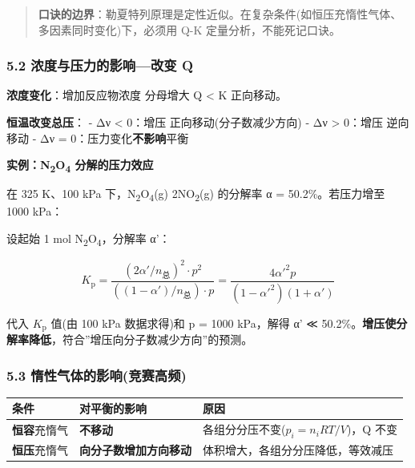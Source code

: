\begin{quote}
\textbf{口诀的边界}：勒夏特列原理是定性近似。在复杂条件(如恒压充惰性气体、多因素同时变化)下，必须用 Q-K 定量分析，不能死记口诀。
\end{quote}

\subsubsection{5.2 浓度与压力的影响---改变 Q}\label{ux6d53ux5ea6ux4e0eux538bux529bux7684ux5f71ux54cdux6539ux53d8-q}

\textbf{浓度变化}：增加反应物浓度 \箭 分母增大 \箭 Q \textless{} K \箭 正向移动。

\textbf{恒温改变总压}：
- Δν \textless{} 0：增压 \箭 正向移动(分子数减少方向)
- Δν \textgreater{} 0：增压 \箭 逆向移动
- Δν = 0：压力变化\textbf{不影响}平衡

\textbf{实例：N\textsubscript{2}O\textsubscript{4} 分解的压力效应}

在 325 K、100 kPa 下，N\textsubscript{2}O\textsubscript{4}(g) \衡 2NO\textsubscript{2}(g) 的分解率 α = 50.2\%。若压力增至 1000 kPa：

设起始 1 mol N\textsubscript{2}O\textsubscript{4}，分解率 α'：

\[
K_{\mathrm p} = \frac{(2\alpha'/n_{总})^2 \cdot p^2}{((1-\alpha')/n_{总}) \cdot p} = \frac{4\alpha'^2 p}{(1-\alpha'^2)(1+\alpha')}
\]

代入 \(K_{\mathrm p}\) 值(由 100 kPa 数据求得)和 p = 1000 kPa，解得 α' ≪ 50.2\%。\textbf{增压使分解率降低}，符合''增压向分子数减少方向''的预测。

\subsubsection{5.3 惰性气体的影响(竞赛高频)}\label{ux60f0ux6027ux6c14ux4f53ux7684ux5f71ux54cdux7adeux8d5bux9ad8ux9891}

{\def\LTcaptype{none} %
\begin{longtable}[]{@{}
  >{\raggedright\arraybackslash}p{}
  >{\raggedright\arraybackslash}p{}
  >{\raggedright\arraybackslash}p{}@{}}
\toprule\noalign{}
\begin{minipage}[b]{\linewidth}\raggedright
条件
\end{minipage} & \begin{minipage}[b]{\linewidth}\raggedright
对平衡的影响
\end{minipage} & \begin{minipage}[b]{\linewidth}\raggedright
原因
\end{minipage} \\
\midrule\noalign{}
\endhead
\bottomrule\noalign{}
\endlastfoot
\textbf{恒容}充惰气 & \textbf{不移动} & 各组分分压不变(\(p_i = n_iRT/V\))，Q 不变 \\
\textbf{恒压}充惰气 & \textbf{向分子数增加方向移动} & 体积增大，各组分分压降低，等效减压 \\
\end{longtable}
}

